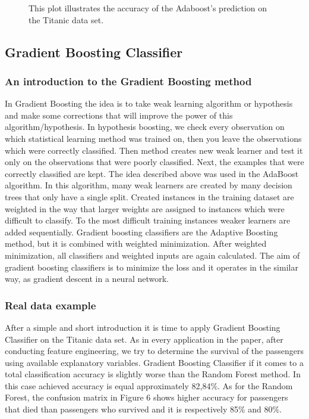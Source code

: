 \begin{figure}[H]
    \captionsetup{format=plain}
    \caption
        {This plot illustrates the accuracy of the Adaboost's prediction on the Titanic data set.
        }
    \label{fig:confusion_matrix_adaboost}
\end{figure}


\subsection{Gradient Boosting Classifier}
\label{sec:gradient_boosting}

\subsubsection{An introduction to the Gradient Boosting method}
In Gradient Boosting the idea is to take weak learning algorithm or hypothesis and make some corrections that will improve the power of this algorithm/hypothesis. In hypothesis boosting, we check every observation on which statistical learning method was trained on, then you leave the observations which were correctly classified. Then method creates new weak learner and test it only on the observations that were poorly classified. Next, the examples that were correctly classified are kept.
The idea described above was used in the AdaBoost algorithm. In this algorithm, many weak learners are created by many decision trees that only have a single split. Created instances in the training dataset are weighted in the way that larger weights are assigned to instances which were difficult to classify. To the most difficult training instances weaker learners are added sequentially.
Gradient boosting classifiers are the Adaptive Boosting method, but it is combined with weighted minimization. After weighted minimization, all classifiers and weighted inputs are again calculated. The aim of gradient boosting classifiers is to minimize the loss and it operates in the similar way, as gradient descent in a neural network.
\subsubsection{Real data example}

After a simple and short introduction it is time to apply Gradient Boosting Classifier on the Titanic data set. As in every application in the paper,
after conducting feature engineering, we try to determine the survival of the passengers using available explanatory variables. 
Gradient Boosting Classifier if it comes to a total classification accuracy is slightly worse than the Random Forest method. In this case achieved accuracy is equal
approximately 82,84\%. 
As for the Random Forest, the confusion matrix in Figure 6
shows higher accuracy for passengers that died than passengers who survived and it is respectively 85\% and 80\%.


